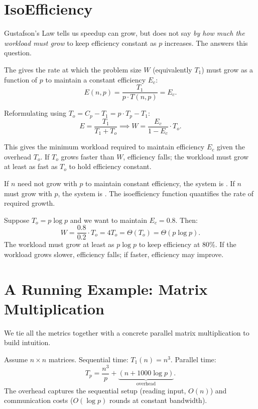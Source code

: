 \section{IsoEfficiency}

Gustafson's Law tells us speedup can grow, but does not say \emph{by how much
the workload must grow} to keep efficiency constant as $p$ increases. The
 answers this question.

\begin{ppdefn}
The  gives the rate at which the problem size $W$
(equivalently $T_1$) must grow as a function of $p$ to maintain a constant
efficiency $E_c$:
\[
  E(n, p) = \frac{T_1}{p \cdot T(n, p)} = E_c.
\]
\end{ppdefn}

Reformulating using $T_o = C_p - T_1 = p \cdot T_p - T_1$:
\[
  E = \frac{T_1}{T_1 + T_o} \implies W = \frac{E_c}{1 - E_c} \cdot T_o.
\]

This gives the minimum workload required to maintain efficiency $E_c$ given
the overhead $T_o$. If $T_o$ grows faster than $W$, efficiency falls; the
workload must grow at least as fast as $T_o$ to hold efficiency constant.

\begin{ppnote}
If $n$ need not grow with $p$ to maintain constant efficiency, the system is
. If $n$ must grow with $p$, the system is
. The isoefficiency function quantifies the rate of
required growth.
\end{ppnote}

\begin{ppexample}
Suppose $T_o = p \log p$ and we want to maintain $E_c = 0.8$. Then:
\[
  W = \frac{0.8}{0.2} \cdot T_o = 4 T_o = \Theta(T_o) = \Theta(p \log p).
\]
The workload must grow at least as $p \log p$ to keep efficiency at 80\%.
If the workload grows slower, efficiency falls; if faster, efficiency may
improve.
\end{ppexample}

\section{A Running Example: Matrix Multiplication}

We tie all the metrics together with a concrete parallel matrix multiplication
to build intuition.

Assume $n \times n$ matrices. Sequential time: $T_1(n) = n^3$. Parallel time:
\[
  T_p = \frac{n^3}{p} + \underbrace{(n + 1000 \log p)}_{\text{overhead}}.
\]
The overhead captures the sequential setup (reading input, $O(n)$) and
communication costs ($O(\log p)$ rounds at constant bandwidth).

